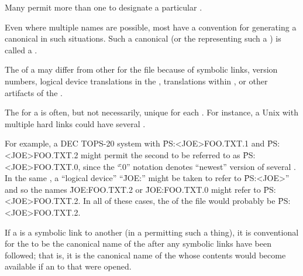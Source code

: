 
\endsubsection%


Many  permit more than one  to designate 
a particular .

Even where multiple names are possible, most  have a convention
for generating a canonical  in such situations.  Such a canonical
 (or the  representing such a ) is
called a .  

The  of a  may differ from other 
for the file because of
     symbolic links,
     version numbers,
     logical device translations in the ,
      translations within \clisp,
  or other artifacts of the .

The  for a  is often, but not necessarily, unique for
each .  For instance, a Unix  with multiple hard links 
could have several .


For example, a DEC TOPS-20 system with  \f{PS:<JOE>FOO.TXT.1} 
and \f{PS:<JOE>FOO.TXT.2} might permit the second  to be referred
to as \f{PS:<JOE>FOO.TXT.0}, since the ``\f{.0}'' notation denotes ``newest''
version of several .
In the same , a ``logical device'' ``\f{JOE:}'' might be 
taken to refer to \f{PS:<JOE>}'' and so the names \f{JOE:FOO.TXT.2} or
\f{JOE:FOO.TXT.0} might refer to \f{PS:<JOE>FOO.TXT.2}.
In all of these cases, the  of the file would probably be
\f{PS:<JOE>FOO.TXT.2}.

If a  is a symbolic link to another  (in a 
permitting such a thing), it is conventional for the  to be
the canonical name of the  after any symbolic links have been followed;
that is, it is the canonical name of the  whose contents would
become available if an   to that  were 
opened.

